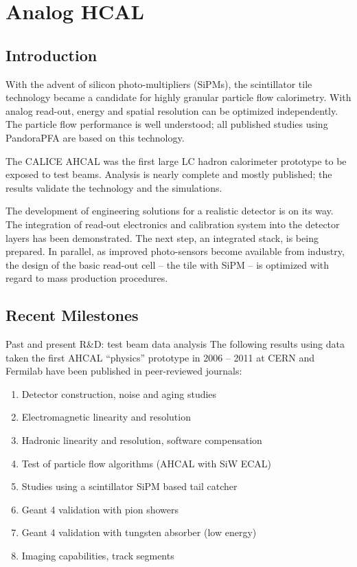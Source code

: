 \section{Analog HCAL}
\subsection{Introduction}
With the advent of silicon photo-multipliers (SiPMs), the scintillator tile technology became a candidate for highly granular particle flow calorimetry. With analog read-out, energy and spatial resolution can be optimized independently. The particle flow performance is well understood; all published studies using PandoraPFA are based on this technology.

The CALICE AHCAL was the first large LC hadron calorimeter prototype to be exposed to test beams. Analysis is nearly complete and mostly published; the results validate the technology and the simulations.

The development of engineering solutions for a realistic detector is on its way. The integration of read-out electronics and calibration system into the detector layers has been demonstrated. The next step, an integrated stack, is being prepared. In parallel, as improved photo-sensors become available from industry, the design of the basic read-out cell -- the tile with SiPM -- is optimized with regard to mass production procedures.

\subsection{Recent Milestones}
Past and present R\&D: test beam data analysis
The following results using data taken the first AHCAL ``physics'' prototype in 2006 -- 2011 at CERN and Fermilab have been published in peer-reviewed journals:
\begin{enumerate}
\item Detector construction, noise and aging studies~\cite{1748-0221-5-05-P05004}
\item Electromagnetic linearity and resolution~\cite{1748-0221-6-04-P04003}
\item Hadronic linearity and resolution, software compensation~\cite{1748-0221-7-09-P09017}
\item Test of particle flow algorithms (AHCAL with SiW ECAL)~\cite{1748-0221-6-07-P07005}
\item Studies using a scintillator SiPM based tail catcher~\cite{1748-0221-7-04-P04015}
\item Geant 4 validation with pion showers~\cite{1748-0221-8-07-P07005}
\item Geant 4 validation with tungsten absorber (low energy)~\cite{1748-0221-9-01-P01004}
\item Imaging capabilities, track segments~\cite{1748-0221-8-09-P09001}
\end{enumerate}

